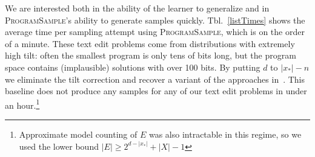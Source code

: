 \documentclass{article}
\newcommand{\theSystem}{\textsc{ProgramSample}}
\begin{document}
We are interested both in the ability of the learner to generalize
and in \theSystem{}'s ability to generate samples quickly.
Tbl.~\ref{listTimes} shows the average time per sampling attempt using \theSystem{}, which is on the order of a minute.
These text edit problems come from distributions with extremely high tilt: often the smallest program is only tens of  bits long, but the program space contains (implausible) solutions with over 100 bits.
 By putting $d$ to $\lvert x_* \rvert -n$ we eliminate the tilt correction and recover a variant of the approaches in~\cite{ermon2013embed}. %
This baseline does not produce any samples for any of our text edit problems in under an hour.\footnote{Approximate model counting of $E$ was also intractable in this regime, so we used the lower bound $|E|\geq 2^{d-\lvert x_* \rvert } + |X| - 1$}
\end{document}
